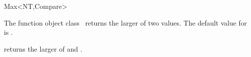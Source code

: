 \begin{ccRefFunctionObjectClass}{Max<NT,Compare>}

\ccDefinition

The function object class \ccRefName\ returns the larger of two values.
The default value for  is .



\ccIsModel
{}

{returns the larger of  and .}

\end{ccRefFunctionObjectClass}
